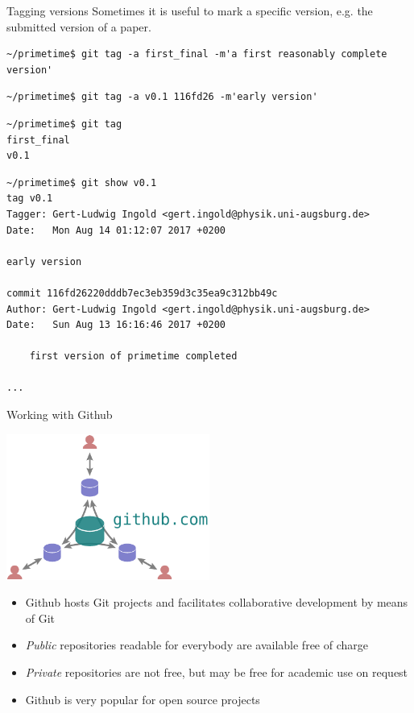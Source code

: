 \documentclass[svgnames]{beamer}
\begin{document}
\begin{frame}[fragile]{Tagging versions}
 Sometimes it is useful to mark a specific version, e.g. the submitted version of a paper.

 \vspace{0.2truecm}
 \begin{lstlisting}[breaklines=true]
~/primetime$ git tag -a first_final -m'a first reasonably complete version'
 \end{lstlisting}

 \begin{lstlisting}
~/primetime$ git tag -a v0.1 116fd26 -m'early version'
 \end{lstlisting}

 \begin{lstlisting}
~/primetime$ git tag
first_final
v0.1
 \end{lstlisting}

 \begin{lstlisting}[basicstyle={\ttfamily\tiny}]
~/primetime$ git show v0.1
tag v0.1
Tagger: Gert-Ludwig Ingold <gert.ingold@physik.uni-augsburg.de>
Date:   Mon Aug 14 01:12:07 2017 +0200

early version

commit 116fd26220dddb7ec3eb359d3c35ea9c312bb49c
Author: Gert-Ludwig Ingold <gert.ingold@physik.uni-augsburg.de>
Date:   Sun Aug 13 16:16:46 2017 +0200

    first version of primetime completed

...
 \end{lstlisting}
\end{frame}

\begin{frame}{Working with Github}
 \begin{center}
  \includegraphics[width=0.5\textwidth]{github}
 \end{center}

 \begin{itemize}
  \item Github hosts Git projects and facilitates collaborative development by means of Git
  \item \textit{Public} repositories readable for everybody are available free of charge
  \item \textit{Private} repositories are not free, but may be free for academic use on request
  \item Github is very popular for open source projects
 \end{itemize}
\end{frame}
\end{document}
